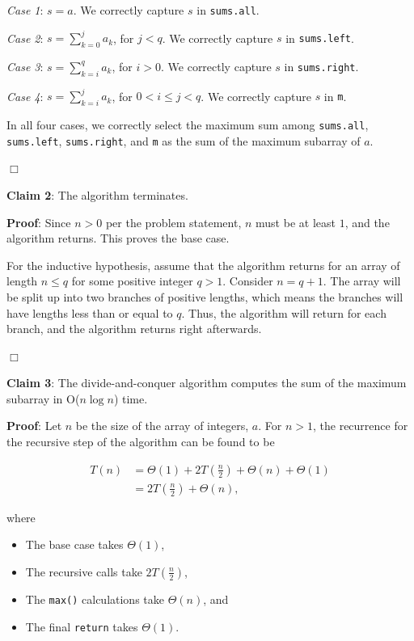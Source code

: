 \documentclass[a4paper,10pt]{article}
\begin{document}
		{\it Case 1}: $\displaystyle s = a$. We correctly capture $s$ in {\tt sums.all}.

		{\it Case 2}: $\displaystyle s = \sum_{k=0}^j a_k$, for $j < q$. We correctly capture $s$ in {\tt sums.left}.

		{\it Case 3}: $\displaystyle s = \sum_{k=i}^q a_k$, for $i > 0$. We correctly capture $s$ in {\tt sums.right}.

		{\it Case 4}: $\displaystyle s = \sum_{k=i}^j a_k$, for $0 < i \leq j < q$. We correctly capture $s$ in {\tt m}.

		In all four cases, we correctly select the maximum sum among {\tt sums.all}, {\tt sums.left}, {\tt sums.right}, and {\tt m} as the sum of the maximum subarray of $a$.

		\begin{center}
		$\Box$
		\end{center}

		
		{\bf Claim 2}: The algorithm terminates.

		{\bf Proof}: Since $n>0$ per the problem statement, $n$ must be at least $1$, and the algorithm returns. This proves the base case.

		For the inductive hypothesis, assume that the algorithm returns for an array of length $n \leq q$ for some positive integer $q>1$. Consider $n=q+1$. The array will be split up into two branches of positive lengths, which means the branches will have lengths less than or equal to $q$. Thus, the algorithm will return for each branch, and the algorithm returns right afterwards.

		\begin{center}
		$\Box$
		\end{center}


		{\bf Claim 3}: The divide-and-conquer algorithm computes the sum of the maximum subarray in O($n \log n$) time.

		{\bf Proof}: Let $n$ be the size of the array of integers, $a$. For $n>1$, the recurrence for the recursive step of the algorithm can be found to be

		\begin{align*}
		T(n) &= \Theta(1) + 2T\left(\frac{n}{2}\right) + \Theta(n) + \Theta(1) \\
		     &= 2T\left(\frac{n}{2}\right) + \Theta(n),
		\end{align*}

		where

		\begin{itemize}
		\item The base case takes $\Theta(1)$,
		\item The recursive calls take $2T\left(\frac{n}{2}\right)$,
		\item The {\tt max()} calculations take $\Theta(n)$, and
		\item The final {\tt return} takes $\Theta(1)$.
		\end{itemize}
\end{document}
